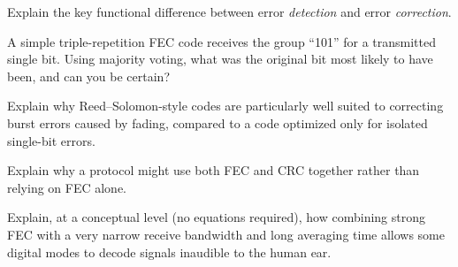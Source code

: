 \begin{practiceproblems}
\item Explain the key functional difference between error
\emph{detection} and error \emph{correction}.
\item A simple triple-repetition FEC code receives the group ``101''
for a transmitted single bit. Using majority voting, what was the
original bit most likely to have been, and can you be certain?
\item Explain why Reed--Solomon-style codes are particularly well suited
to correcting burst errors caused by fading, compared to a code
optimized only for isolated single-bit errors.
\item Explain why a protocol might use both FEC and CRC together rather
than relying on FEC alone.
\item Explain, at a conceptual level (no equations required), how
combining strong FEC with a very narrow receive bandwidth and long
averaging time allows some digital modes to decode signals inaudible to
the human ear.
\end{practiceproblems}
